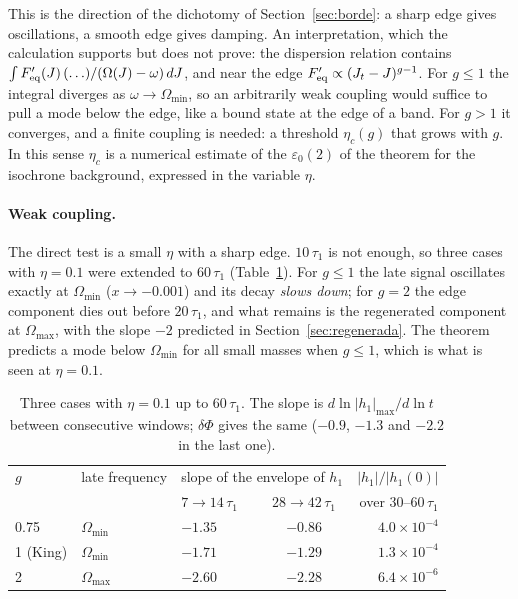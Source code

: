 \documentclass[11pt,a4paper]{article}
\begin{document}
This is the direction of the dichotomy of Section~\ref{sec:borde}: a sharp edge gives
oscillations, a smooth edge gives damping. An interpretation, which the calculation
supports but does not prove: the dispersion relation contains
$\int F_{\rm eq}'(J)\,(\ldots)/(\Omega(J)-\omega)\,dJ$, and near the edge $F_{\rm eq}'\propto(J_t-J)^{g-1}$. For
$g\le1$ the integral diverges as $\omega\to\Omega_{\min}$, so an arbitrarily weak coupling would suffice
to pull a mode below the edge, like a bound state at the edge of a band. For $g>1$ it
converges, and a finite coupling is needed: a threshold $\eta_c(g)$ that grows with $g$. In
this sense $\eta_c$ is a numerical estimate of the $\varepsilon_0(2)$ of the theorem for the
isochrone background, expressed in the variable $\eta$.

\paragraph{Weak coupling.} The direct test is a small $\eta$ with a sharp edge. $10\,\tau_1$ is
not enough, so three cases with $\eta=0.1$ were extended to $60\,\tau_1$
(Table~\ref{tab:borde_largo}). For $g\le1$ the late signal oscillates exactly at $\Omega_{\min}$
($x\to-0.001$) and its decay \emph{slows down}; for $g=2$ the edge component dies out before
$20\,\tau_1$, and what remains is the regenerated component at $\Omega_{\max}$, with the slope $-2$
predicted in Section~\ref{sec:regenerada}. The theorem predicts a mode below $\Omega_{\min}$ for
all small masses when $g\le1$, which is what is seen at $\eta=0.1$.

\begin{table}[!htbp]
\centering
\small
\begin{tabular}{lllcr}
\toprule
$g$ & late frequency & \multicolumn{2}{l}{slope of the envelope of $h_1$} & $|h_1|/|h_1(0)|$\\
 & & $7\to14\,\tau_1$ & $28\to42\,\tau_1$ & over $30$--$60\,\tau_1$\\
\midrule
0.75 & $\Omega_{\min}$ & $-1.35$ & $-0.86$ & $4.0\times10^{-4}$\\
1 (King) & $\Omega_{\min}$ & $-1.71$ & $-1.29$ & $1.3\times10^{-4}$\\
2 & $\Omega_{\max}$ & $-2.60$ & $-2.28$ & $6.4\times10^{-6}$\\
\bottomrule
\end{tabular}
\caption{Three cases with $\eta=0.1$ up to $60\,\tau_1$. The slope is $d\ln|h_1|_{\max}/d\ln t$ between
consecutive windows; $\delta\Phi$ gives the same ($-0.9$, $-1.3$ and $-2.2$ in the last one).}
\label{tab:borde_largo}
\end{table}
\end{document}
